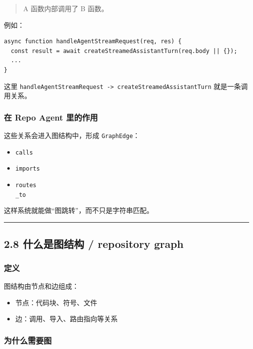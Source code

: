 \documentclass[UTF8,12pt,openany]{ctexbook}
\begin{document}
\begin{quote}
A 函数内部调用了 B 函数。
\end{quote}

例如：\par

\begin{lstlisting}
async function handleAgentStreamRequest(req, res) {
  const result = await createStreamedAssistantTurn(req.body || {});
  ...
}
\end{lstlisting}

这里 \texttt{handleAgentStreamRequest -> createStreamedAssistantTurn} 就是一条调用关系。\par

\subsubsection{在 Repo Agent 里的作用}

这些关系会进入图结构中，形成 \texttt{GraphEdge}：\par

\begin{itemize}
\item \texttt{calls}
\item \texttt{imports}
\item \texttt{routes\\_to}
\end{itemize}

这样系统就能做“图跳转”，而不只是字符串匹配。\par

\hrule

\subsection{2.8 什么是图结构 / repository graph}

\subsubsection{定义}

图结构由节点和边组成：\par

\begin{itemize}
\item 节点：代码块、符号、文件
\item 边：调用、导入、路由指向等关系
\end{itemize}

\subsubsection{为什么需要图}
\end{document}
